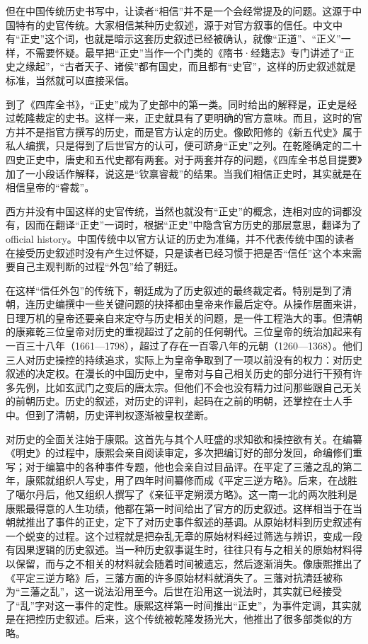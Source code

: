 
但在中国传统历史书写中，让读者“相信”并不是一个会经常提及的问题。这源于中国特有的史官传统。大家相信某种历史叙述，源于对官方叙事的信任。中文中有“正史”这个词，也就是暗示这套历史叙述已经被确认，就像“正道”、“正义”一样，不需要怀疑。最早把“正史”当作一个门类的《隋书·经籍志》专门讲述了“正史之缘起”，“古者天子、诸侯”都有国史，而且都有“史官”，这样的历史叙述就是标准，当然就可以直接采信。



到了《四库全书》，“正史”成为了史部中的第一类。同时给出的解释是，正史是经过乾隆裁定的史书。这样一来，正史就具有了更明确的官方意味。而且，这时的官方并不是指官方撰写的历史，而是官方认定的历史。像欧阳修的《新五代史》属于私人编撰，只是得到了后世官方的认可，便可跻身“正史”之列。在乾隆确定的二十四史正史中，唐史和五代史都有两套。对于两套并存的问题，《四库全书总目提要》加了一小段话作解释，说这是“钦禀睿裁”的结果。当我们相信正史时，其实就是在相信皇帝的“睿裁”。



西方并没有中国这样的史官传统，当然也就没有“正史”的概念，连相对应的词都没有，因而在翻译“正史”一词时，根据“正史”中隐含官方历史的那层意思，翻译为了official history。中国传统中以官方认证的历史为准绳，并不代表传统中国的读者在接受历史叙述时没有产生过怀疑，只是读者已经习惯于把是否“信任”这个本来需要自己主观判断的过程“外包”给了朝廷。



在这样“信任外包”的传统下，朝廷成为了历史叙述的最终裁定者。特别是到了清朝，连历史编撰中一些关键问题的抉择都由皇帝来作最后定夺。从操作层面来讲，日理万机的皇帝还要亲自来定夺与历史相关的问题，是一件工程浩大的事。但清朝的康雍乾三位皇帝对历史的重视超过了之前的任何朝代。三位皇帝的统治加起来有一百三十八年（1661—1798），超过了存在一百零八年的元朝（1260—1368）。他们三人对历史操控的持续追求，实际上为皇帝争取到了一项以前没有的权力：对历史叙述的决定权。在漫长的中国历史中，皇帝对与自己相关历史的部分进行干预有许多先例，比如玄武门之变后的唐太宗。但他们不会也没有精力过问那些跟自己无关的前朝历史。历史的叙述，对历史的评判，起码在之前的明朝，还掌控在士人手中。但到了清朝，历史评判权逐渐被皇权垄断。



对历史的全面关注始于康熙。这首先与其个人旺盛的求知欲和操控欲有关。在编纂《明史》的过程中，康熙会亲自阅读审定，多次把编订好的部分发回，命编修们重写；对于编纂中的各种事件专题，他也会亲自过目品评。在平定了三藩之乱的第二年，康熙就组织人写史，用了四年时间纂修而成《平定三逆方略》。后来，在战胜了噶尔丹后，他又组织人撰写了《亲征平定朔漠方略》。这一南一北的两次胜利是康熙最得意的人生功绩，他都在第一时间给出了官方的历史叙述。这样相当于在当朝就推出了事件的正史，定下了对历史事件叙述的基调。从原始材料到历史叙述有一个蜕变的过程。这个过程就是把杂乱无章的原始材料经过筛选与辨识，变成一段有因果逻辑的历史叙述。当一种历史叙事诞生时，往往只有与之相关的原始材料得以保留，而与之不相关的材料就会随着时间被遗忘，然后逐渐消失。像康熙推出了《平定三逆方略》后，三藩方面的许多原始材料就消失了。三藩对抗清廷被称为“三藩之乱”，这一说法沿用至今。后世在沿用这一说法时，其实就已经接受了“乱”字对这一事件的定性。康熙这样第一时间推出“正史”，为事件定调，其实就是在把控历史叙述。后来，这个传统被乾隆发扬光大，他推出了很多部类似的方略。


